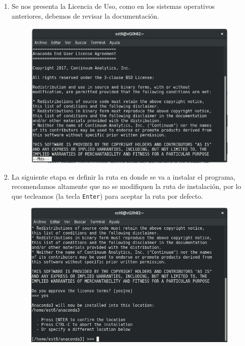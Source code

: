 \documentclass[12pt]{article}
\begin{document}
\begin{enumerate}
\begin{figure}[H]
\end{figure}
\item Se nos presenta la Licencia de Uso, como en los sistemas operativos anteriores, debemos de revisar la documentación.
\begin{figure}[H]
 	\centering
 	\includegraphics[scale=0.35]{Imagenes/Instalacion_Anaconda_01_linux_06}
\end{figure}
\item La siguiente etapa es definir la ruta en donde se va a instalar el programa, recomendamos altamente que no se modifiquen la ruta de instalación, por lo que tecleamos \keys{\return} (la tecla \texttt{Enter}) para aceptar la ruta por defecto.
\begin{figure}[H]
 	\centering
 	\includegraphics[scale=0.35]{Imagenes/Instalacion_Anaconda_01_linux_07}
\end{figure}

\end{enumerate}
\end{document}
